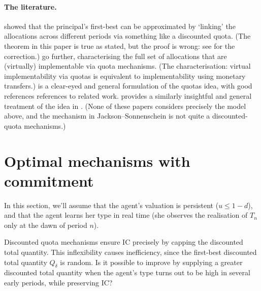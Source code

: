 \paragraph{The literature.}
\textcite{JacksonSonnenschein2007} showed that the principal's first-best can be approximated by `linking' the allocations across different periods via something like a discounted quota.
(The theorem in this paper is true as stated, but the proof is wrong: see \textcite{BallJacksonKattwinkel2022} for the correction.)
\textcite{MatsushimaMiyazakiYagi2010,Ishii2016} go further, characterising the full set of allocations that are (virtually) implementable via quota mechanisms.
(The characterisation: virtual implementability via quotas is equivalent to implementability using monetary transfers.)
\textcite{Frankel2016jet} is a clear-eyed and general formulation of the quotas idea, with good references references to related work.
\textcite{Frankel2016aej} provides a similarly insightful and general treatment of the idea in .
(None of these papers considers precisely the model above,
and the mechanism in Jackson--Sonnenschein is not quite a discounted-quota mechanisms.)



\section{Optimal mechanisms with commitment}
\label{sec:ch3:guohorner}

In this section, we'll assume that the agent's valuation is persistent ($u \leq 1-d$),
and that the agent learns her type in real time (she observes the realisation of $T_n$ only at the dawn of period $n$).

Discounted quota mechanisms ensure IC
precisely by capping the discounted total quantity.
This inflexibility causes inefficiency, since the first-best discounted total quantity $Q_\delta$ is random.
Is it possible to improve by supplying a greater discounted total quantity when the agent's type turns out to be high in several early periods, while preserving IC?

